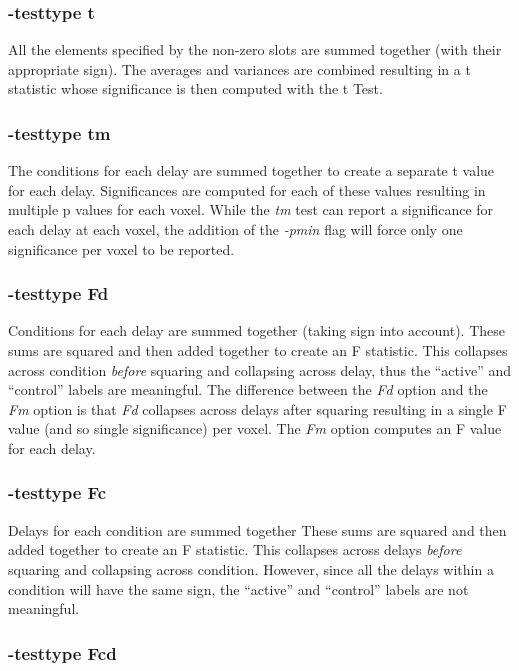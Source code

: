 \documentclass[10pt]{article}
\begin{document}
\subsubsection{ -testtype t}

All the elements specified by the non-zero slots are summed together
(with their appropriate sign).  The averages and variances are
combined resulting in a t statistic whose significance is then computed
with the t Test.

\subsubsection{ -testtype tm}

The conditions for each delay are summed together to create a separate
t value for each delay.  Significances are computed for each of these
values resulting in multiple p values for each voxel.  While the {\em
tm} test can report a significance for each delay at each voxel, the
addition of the {\em -pmin} flag will force only one significance per
voxel to be reported.

\subsubsection{ -testtype Fd}

Conditions for each delay are summed together (taking sign into
account).  These sums are squared and then added together to
create an F statistic.  This collapses across condition {\em before}
squaring and collapsing across delay, thus the ``active'' and 
``control'' labels are meaningful.  The difference between the {\em
Fd} option and the {\em Fm} option is that {\em Fd} collapses 
across delays after squaring resulting in a single F value (and
so single significance) per voxel.  The {\em Fm} option computes
an F value for each delay.

\subsubsection{ -testtype Fc}

Delays for each condition are summed together These sums are squared
and then added together to create an F statistic.  This collapses
across delays {\em before} squaring and collapsing across condition.
However, since all the delays within a condition will have the same
sign, the ``active'' and ``control'' labels are not meaningful.

\subsubsection{ -testtype Fcd}
\end{document}
